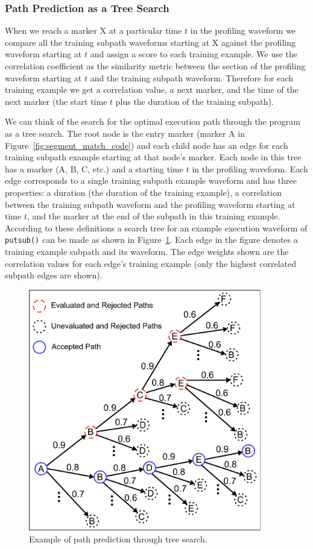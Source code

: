 \subsubsection{Path Prediction as a Tree Search}
When we reach a marker X at a particular time $t$ in the profiling waveform we compare all the training subpath waveforms starting at X against the profiling waveform starting at $t$ and assign a score to each training example. We use the correlation coefficient as the similarity metric between the section of the profiling waveform starting at $t$ and the training subpath waveform. Therefore for each training example we get a correlation value, a next marker, and the time of the next marker (\ie the start time $t$ plus the duration of the training subpath).

We can think of the search for the optimal execution path through the program as a tree search. The root node is the entry marker (marker A in Figure~\ref{fig:segment_match_code}) and each child node has an edge for each training subpath example starting at that node's marker. Each node in this tree has a marker (\eg A, B, C, etc.) and a starting time $t$ in the profiling waveform. Each edge corresponds to a single training subpath example waveform and has three properties: a duration (the duration of the training example), a correlation between the training subpath waveform and the profiling waveform starting at time $t$, and the marker at the end of the subpath in this training example. According to these definitions a search tree for an example execution waveform of \texttt{putsub()} can be made as shown in Figure~\ref{fig:backtracking}. Each edge in the figure denotes a training example subpath and its waveform. The edge weights shown are the correlation values for each edge's training example (only the highest correlated subpath edges are shown).

\begin{figure}[t]
\includegraphics[width=4in]{../issta_profile/profiling/figures/backtracking}
\caption{Example of path prediction through tree search.}
\label{fig:backtracking}
\end{figure}

